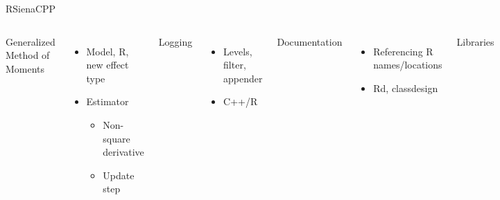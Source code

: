 \documentclass[]{beamer}                                                %
\begin{document}

\begin{frame}[fragile]{RSienaCPP}                                       %
  \begin{columns}[t]
    Generalized Method of Moments
    \begin{itemize}
      \item Model, R, new effect type
      \item Estimator
        \begin{itemize}
          \item Non-square derivative
          \item Update step
        \end{itemize}
    \end{itemize}
    Logging
    \begin{itemize}
      \item Levels, filter, appender
      \item C++/R
    \end{itemize}
    Documentation
    \begin{itemize}
      \item Referencing R names/locations
      \item Rd, classdesign
    \end{itemize}
    Libraries
    \begin{itemize}
      \item Eigen (lina)
      \item MPI (cluster), OpenMP (threads)
      \item Automatic build configuration
    \end{itemize}


\end{columns}
\end{frame}
\end{document}
